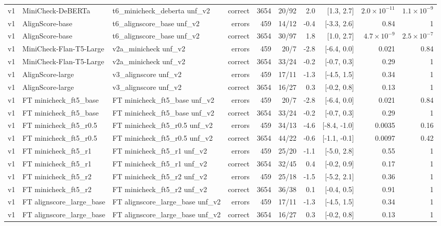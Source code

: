 \begin{scriptsize}
\begin{longtable}{lllrrrrrrr}
v1 & MiniCheck-DeBERTa & t6\_minicheck\_deberta unf\_v2 & correct & 3654 & 20/92 & 2.0 & [1.3, 2.7] & $2.0\times10^{-11}$ & $1.1\times10^{-9}$ \\
v1 & AlignScore-base & t6\_alignscore\_base unf\_v2 & errors & 459 & 14/12 & -0.4 & [-3.3, 2.6] & 0.84 & 1 \\
v1 & AlignScore-base & t6\_alignscore\_base unf\_v2 & correct & 3654 & 30/97 & 1.8 & [1.0, 2.7] & $4.7\times10^{-9}$ & $2.5\times10^{-7}$ \\
v1 & MiniCheck-Flan-T5-Large & v2a\_minicheck unf\_v2 & errors & 459 & 20/7 & -2.8 & [-6.4, 0.0] & 0.021 & 0.84 \\
v1 & MiniCheck-Flan-T5-Large & v2a\_minicheck unf\_v2 & correct & 3654 & 33/24 & -0.2 & [-0.7, 0.3] & 0.29 & 1 \\
v1 & AlignScore-large & v3\_alignscore unf\_v2 & errors & 459 & 17/11 & -1.3 & [-4.5, 1.5] & 0.34 & 1 \\
v1 & AlignScore-large & v3\_alignscore unf\_v2 & correct & 3654 & 16/27 & 0.3 & [-0.2, 0.8] & 0.13 & 1 \\
v1 & FT minicheck\_ft5\_base & FT minicheck\_ft5\_base unf\_v2 & errors & 459 & 20/7 & -2.8 & [-6.4, 0.0] & 0.021 & 0.84 \\
v1 & FT minicheck\_ft5\_base & FT minicheck\_ft5\_base unf\_v2 & correct & 3654 & 33/24 & -0.2 & [-0.7, 0.3] & 0.29 & 1 \\
v1 & FT minicheck\_ft5\_r0.5 & FT minicheck\_ft5\_r0.5 unf\_v2 & errors & 459 & 34/13 & -4.6 & [-8.4, -1.0] & 0.0035 & 0.16 \\
v1 & FT minicheck\_ft5\_r0.5 & FT minicheck\_ft5\_r0.5 unf\_v2 & correct & 3654 & 44/22 & -0.6 & [-1.1, -0.1] & 0.0097 & 0.42 \\
v1 & FT minicheck\_ft5\_r1 & FT minicheck\_ft5\_r1 unf\_v2 & errors & 459 & 25/20 & -1.1 & [-5.0, 2.8] & 0.55 & 1 \\
v1 & FT minicheck\_ft5\_r1 & FT minicheck\_ft5\_r1 unf\_v2 & correct & 3654 & 32/45 & 0.4 & [-0.2, 0.9] & 0.17 & 1 \\
v1 & FT minicheck\_ft5\_r2 & FT minicheck\_ft5\_r2 unf\_v2 & errors & 459 & 25/18 & -1.5 & [-5.2, 2.1] & 0.36 & 1 \\
v1 & FT minicheck\_ft5\_r2 & FT minicheck\_ft5\_r2 unf\_v2 & correct & 3654 & 36/38 & 0.1 & [-0.4, 0.5] & 0.91 & 1 \\
v1 & FT alignscore\_large\_base & FT alignscore\_large\_base unf\_v2 & errors & 459 & 17/11 & -1.3 & [-4.5, 1.5] & 0.34 & 1 \\
v1 & FT alignscore\_large\_base & FT alignscore\_large\_base unf\_v2 & correct & 3654 & 16/27 & 0.3 & [-0.2, 0.8] & 0.13 & 1 \\

\end{longtable}
\end{scriptsize}
